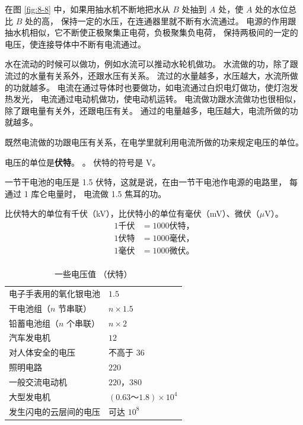 在图 \ref{fig:8-8} 中，如果用抽水机不断地把水从 $B$ 处抽到 $A$ 处，使 $A$ 处的水位总比 $B$ 处的高，
保持一定的水压，在连通器里就不断有水流通过。
电源的作用跟抽水机相似，它不断使正极聚集正电荷，负极聚集负电荷，
保持两极间的一定的电压，使连接导体中不断有电流通过。

水在流动的时候可以做功，例如水流可以推动水轮机做功。
水流做的功，除了跟流过的水量有关系外，还跟水压有关系。
流过的水量越多，水压越大，水流所做的功就越多。
电流在通过导体时也要做功，如电流通过白炽电灯做功，使灯泡发热发光，
电流通过电动机做功，使电动机运转。
电流做功跟水流做功也很相似，除了跟电量有关外，还跟电压有关。
通过的电量越多，电压越大，电流所做的功就越多。

既然电流做的功跟电压有关系，在电学里就利用电流所做的功来规定电压的单位。

电压的单位是\textbf{伏特}。
。
伏特的符号是 V。

一节干电池的电压是 1.5 伏特，这就是说，在由一节干电池作电源的电路里，
每通过 1 库仑电量时， 电流做 1.5 焦耳的功。

比伏特大的单位有千伏（kV），比伏特小的单位有毫伏（mV）、微伏（$\mu$V）。
\begin{align*}
    1 \text{千伏} &= 1000 \text{伏特，}\\
    1 \text{伏特} &= 1000 \text{毫伏，}\\
    1 \text{毫伏} &= 1000 \text{微伏。}\\
\end{align*}

\begin{table}[H]
    \centering
    \caption*{一些电压值 （伏特）}
    \begin{tabular}{w{l}{10em}w{r}{10em}}
        电子手表用的氧化银电池      & $1.5$ \\
        干电池组（$n$ 节串联）      & $n \times 1.5$ \\
        铅蓄电池组（$n$ 个串联）    & $n \times 2$ \\
        汽车发电机                 & $12$ \\
        对人体安全的电压            & 不高于 $36$ \\
        照明电路                    & $220$ \\
        一般交流电动机              & $220$，$380$ \\
        大型发电机                  & $(0.63\text{～}1.8) \times 10^4$ \\
        发生闪电的云层间的电压      & 可达 $10^8$ \\
    \end{tabular}
\end{table}



